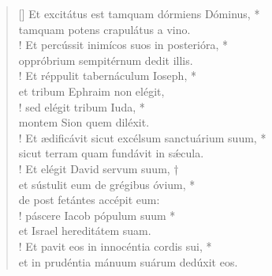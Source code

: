 \begin{verse}[\versewidth]
Et excitátus est tamquam dórmiens Dóminus, *\\
tamquam potens crapulátus a vino.\\!
\vin Et percússit inimícos suos in posterióra, *\\
\vin oppróbrium sempitérnum dedit illis.\\!
Et réppulit tabernáculum Ioseph, *\\
et tribum Ephraim non elégit,\\!
\vin sed elégit tribum Iuda, *\\
\vin montem Sion quem diléxit.\\!
Et ædificávit sicut excélsum sanctuárium suum, *\\
sicut terram quam fundávit in s\'{æ}cula.\\!
\vin Et elégit David servum suum, †\\
\vin et sústulit eum de grégibus óvium, *\\
\vin de post fetántes accépit eum:\\!
páscere Iacob pópulum suum *\\
et Israel hereditátem suam.\\!
\vin Et pavit eos in innocéntia cordis sui, *\\
\vin et in prudéntia mánuum suárum dedúxit eos.\\
\end{verse}
\vspace{1cm}


